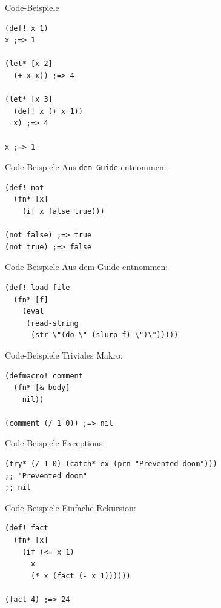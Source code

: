\documentclass[presentation]{beamer}
\begin{document}
\begin{frame}[fragile,label=sec-2-8]{Code-Beispiele}
 \begin{verbatim}
(def! x 1)
x ;=> 1

(let* [x 2]
  (+ x x)) ;=> 4

(let* [x 3]
  (def! x (+ x 1))
  x) ;=> 4

x ;=> 1
\end{verbatim}
\end{frame}

\begin{frame}[fragile,label=sec-2-9]{Code-Beispiele}
 Aus \texttt{dem Guide} entnommen:

\begin{verbatim}
(def! not
  (fn* [x]
    (if x false true)))

(not false) ;=> true
(not true) ;=> false
\end{verbatim}
\end{frame}

\begin{frame}[fragile,label=sec-2-10]{Code-Beispiele}
 Aus \href{https://github.com/kanaka/mal/blob/master/process/guide.md}{dem Guide} entnommen:

\begin{verbatim}
(def! load-file
  (fn* [f]
    (eval
     (read-string
      (str \"(do \" (slurp f) \")\")))))
\end{verbatim}
\end{frame}

\begin{frame}[fragile,label=sec-2-11]{Code-Beispiele}
 Triviales Makro:

\begin{verbatim}
(defmacro! comment
  (fn* [& body]
    nil))

(comment (/ 1 0)) ;=> nil
\end{verbatim}
\end{frame}

\begin{frame}[fragile,label=sec-2-12]{Code-Beispiele}
 Exceptions:

\begin{verbatim}
(try* (/ 1 0) (catch* ex (prn "Prevented doom")))
;; "Prevented doom"
;; nil
\end{verbatim}
\end{frame}

\begin{frame}[fragile,label=sec-2-13]{Code-Beispiele}
 Einfache Rekursion:

\begin{verbatim}
(def! fact
  (fn* [x]
    (if (<= x 1)
      x
      (* x (fact (- x 1))))))

(fact 4) ;=> 24
\end{verbatim}
\end{frame}
\end{document}
